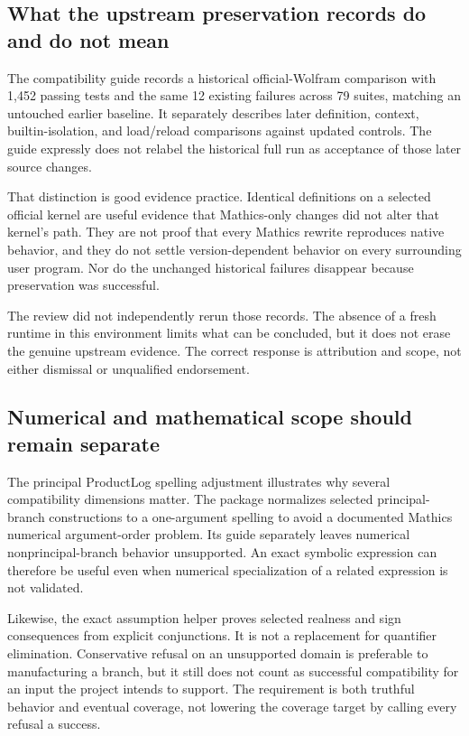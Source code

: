 \documentclass[11pt,letterpaper]{article}
\begin{document}
\subsection{What the upstream preservation records do and do not mean}

The compatibility guide records a historical official-Wolfram comparison with 1,452 passing tests and the same 12 existing failures across 79 suites, matching an untouched earlier baseline. It separately describes later definition, context, builtin-isolation, and load/reload comparisons against updated controls. The guide expressly does not relabel the historical full run as acceptance of those later source changes.~\cite{mathicsguide,preservation}

That distinction is good evidence practice. Identical definitions on a selected official kernel are useful evidence that Mathics-only changes did not alter that kernel's path. They are not proof that every Mathics rewrite reproduces native behavior, and they do not settle version-dependent behavior on every surrounding user program. Nor do the unchanged historical failures disappear because preservation was successful.

The review did not independently rerun those records. The absence of a fresh runtime in this environment limits what can be concluded, but it does not erase the genuine upstream evidence. The correct response is attribution and scope, not either dismissal or unqualified endorsement.

\subsection{Numerical and mathematical scope should remain separate}

The principal ProductLog spelling adjustment illustrates why several compatibility dimensions matter. The package normalizes selected principal-branch constructions to a one-argument spelling to avoid a documented Mathics numerical argument-order problem. Its guide separately leaves numerical nonprincipal-branch behavior unsupported. An exact symbolic expression can therefore be useful even when numerical specialization of a related expression is not validated.~\cite{mcore,mathicsguide}

Likewise, the exact assumption helper proves selected realness and sign consequences from explicit conjunctions. It is not a replacement for quantifier elimination. Conservative refusal on an unsupported domain is preferable to manufacturing a branch, but it still does not count as successful compatibility for an input the project intends to support. The requirement is both truthful behavior and eventual coverage, not lowering the coverage target by calling every refusal a success.~\cite{massumptions,mathicsguide}
\end{document}
